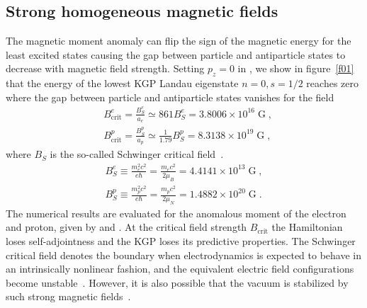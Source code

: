 \subsection{Strong homogeneous magnetic fields}
\label{sec:sbl}
\noindent The magnetic moment anomaly can flip the sign of the magnetic energy for the least excited states causing the gap between particle and antiparticle states to decrease with magnetic field strength. Setting $p_z=0$ in , we show in figure~\ref{f01} that the energy of the lowest KGP Landau eigenstate $n=0, s=1/2$ reaches zero where the gap between particle and antiparticle states vanishes for the field
\begin{subequations}
\begin{alignat}{1}\label{Bcrit}
&B_\mathrm{crit}^{e}=\frac{{B}_{S}^{e}}{a_{e}}\simeq861{B}_{S}^{e} =3.8006\times10^{16}\;\mathrm{G}\;,\\
&B_\mathrm{crit}^{p}=\frac{{B}_{S}^{p}}{a_{p}}\simeq\frac{1}{1.79}{B}_{S}^{p}=8.3138\times10^{19}\;\mathrm{G}\;,
\end{alignat} 
\end{subequations}
where ${B}_{S}$ is the so-called Schwinger critical field~\citep{Schwinger:1951nm}.
\begin{subequations}
\begin{alignat}{1}\label{Bsch}
{B}_{S}^{e}\equiv\frac{{m_{e}^2}c^2}{e\hbar}=\frac{m_{e}c^2}{2\mu_B}=4.4141\times 10^{13}\;\mathrm{G}\;,\\
{B}_{S}^{p}\equiv\frac{{m_{p}^2}c^2}{e\hbar}=\frac{m_{p}c^2}{2\mu_N}=1.4882\times 10^{20}\;\mathrm{G}\;.
\end{alignat}
\end{subequations}
The numerical results are evaluated for the anomalous moment of the electron and proton, given by  and . At the critical field strength $B_\mathrm{crit}$ the Hamiltonian loses self-adjointness and the KGP loses its predictive properties. The Schwinger critical field  denotes the boundary when electrodynamics is expected to behave in an intrinsically nonlinear fashion, and the equivalent electric field configurations become unstable~\citep{Labun:2008re}. However, it is also possible that the vacuum is stabilized by such strong magnetic fields~\citep{Evans:2018kor}.
 
